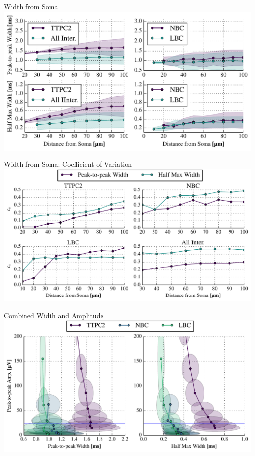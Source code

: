 \documentclass{beamer}
\begin{document}
\begin{frame}{Width from Soma}
    \centering
    \includegraphics[width=\textwidth]{images/TTPC2_NBC_LBC_IN_widths.pdf}
\end{frame}

\begin{frame}{Width from Soma: Coefficient of Variation}
    \centering
    \includegraphics[width=\textwidth]{images/TTPC2_NBC_LBC_IN_snr.pdf}
\end{frame}

\begin{frame}{Combined Width and Amplitude}
    \includegraphics[width=\textwidth]{images/TTPC2_NBC_LBC_IN_combined.pdf}
\end{frame}
\end{document}
